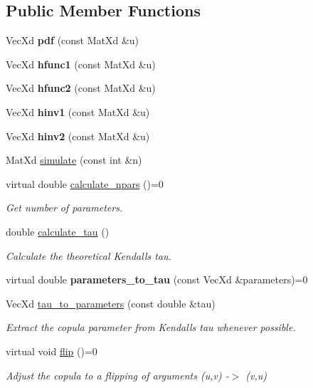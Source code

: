 \subsection*{Public Member Functions}
\begin{DoxyCompactItemize}
\item 
Vec\+Xd {\bfseries pdf} (const Mat\+Xd \&u)
\item 
Vec\+Xd {\bfseries hfunc1} (const Mat\+Xd \&u)
\item 
Vec\+Xd {\bfseries hfunc2} (const Mat\+Xd \&u)
\item 
Vec\+Xd {\bfseries hinv1} (const Mat\+Xd \&u)
\item 
Vec\+Xd {\bfseries hinv2} (const Mat\+Xd \&u)
\item 
Mat\+Xd \hyperlink{class_bicop_afa62d40a17e096cc0f7e769fb2a1285d}{simulate} (const int \&n)
\item 
virtual double \hyperlink{class_bicop_a21f37d9e51460c13be57e48c3d1e7ba4}{calculate\+\_\+npars} ()=0\hypertarget{class_bicop_a21f37d9e51460c13be57e48c3d1e7ba4}{}\label{class_bicop_a21f37d9e51460c13be57e48c3d1e7ba4}

\begin{DoxyCompactList}\small\item\em Get number of parameters. \end{DoxyCompactList}\item 
double \hyperlink{class_bicop_abe228ece449fb66996f91b0fcfed60d3}{calculate\+\_\+tau} ()\hypertarget{class_bicop_abe228ece449fb66996f91b0fcfed60d3}{}\label{class_bicop_abe228ece449fb66996f91b0fcfed60d3}

\begin{DoxyCompactList}\small\item\em Calculate the theoretical Kendall\textquotesingle{}s tau. \end{DoxyCompactList}\item 
virtual double {\bfseries parameters\+\_\+to\+\_\+tau} (const Vec\+Xd \&parameters)=0\hypertarget{class_bicop_aadd4f372b89a2389348893633ec238ba}{}\label{class_bicop_aadd4f372b89a2389348893633ec238ba}

\item 
Vec\+Xd \hyperlink{class_bicop_af20cc82a278f7c5a40dca399402caf10}{tau\+\_\+to\+\_\+parameters} (const double \&tau)\hypertarget{class_bicop_af20cc82a278f7c5a40dca399402caf10}{}\label{class_bicop_af20cc82a278f7c5a40dca399402caf10}

\begin{DoxyCompactList}\small\item\em Extract the copula parameter from Kendall\textquotesingle{}s tau whenever possible. \end{DoxyCompactList}\item 
virtual void \hyperlink{class_bicop_ac7d72dc620a2de66f6c1136329d1b4a3}{flip} ()=0\hypertarget{class_bicop_ac7d72dc620a2de66f6c1136329d1b4a3}{}\label{class_bicop_ac7d72dc620a2de66f6c1136329d1b4a3}

\begin{DoxyCompactList}\small\item\em Adjust the copula to a flipping of arguments (u,v) -\/$>$ (v,u) \end{DoxyCompactList}\end{DoxyCompactItemize}

